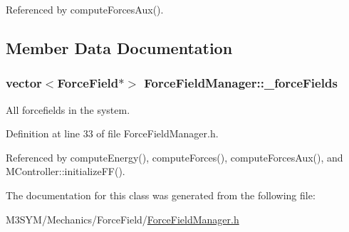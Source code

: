 Referenced by compute\+Forces\+Aux().



\subsection{Member Data Documentation}
\hypertarget{classForceFieldManager_a1236a49ff3af26520cb0ffa0662983eb}{
\subsubsection[{\+\_\+force\+Fields}]{\setlength{\rightskip}{0pt plus 5cm}vector$<${\bf Force\+Field}$\ast$$>$ Force\+Field\+Manager\+::\+\_\+force\+Fields}}\label{classForceFieldManager_a1236a49ff3af26520cb0ffa0662983eb}


All forcefields in the system. 



Definition at line 33 of file Force\+Field\+Manager.\+h.



Referenced by compute\+Energy(), compute\+Forces(), compute\+Forces\+Aux(), and M\+Controller\+::initialize\+F\+F().



The documentation for this class was generated from the following file\+:\begin{DoxyCompactItemize}
\item 
M3\+S\+Y\+M/\+Mechanics/\+Force\+Field/\hyperlink{ForceFieldManager_8h}{Force\+Field\+Manager.\+h}\end{DoxyCompactItemize}

